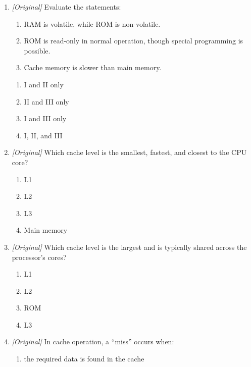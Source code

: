 \documentclass[11pt]{article}
\begin{document}
\begin{enumerate}[label=\textbf{Q\arabic*.}, leftmargin=*]
\begin{enumerate}[label=\Alph*.]
    \item a volatile form of DRAM
    \item an EEPROM-derived non-volatile memory erased in blocks
    \item the mask-programmed type of ROM
    \item a type of CPU register
  \end{enumerate}
\item \textit{[Original]} Evaluate the statements:
  \begin{enumerate}[label=\Roman*.]
    \item RAM is volatile, while ROM is non-volatile.
    \item ROM is read-only in normal operation, though special programming
      is possible.
    \item Cache memory is slower than main memory.
  \end{enumerate}
  \begin{enumerate}[label=\Alph*.]
    \item I and II only
    \item II and III only
    \item I and III only
    \item I, II, and III
  \end{enumerate}
\item \textit{[Original]} Which cache level is the smallest, fastest, and
  closest to the CPU core?
  \begin{enumerate}[label=\Alph*.]
    \item L1
    \item L2
    \item L3
    \item Main memory
  \end{enumerate}
\item \textit{[Original]} Which cache level is the largest and is typically
  shared across the processor's cores?
  \begin{enumerate}[label=\Alph*.]
    \item L1
    \item L2
    \item ROM
    \item L3
  \end{enumerate}
\item \textit{[Original]} In cache operation, a ``miss'' occurs when:
  \begin{enumerate}[label=\Alph*.]
    \item the required data is found in the cache

\end{enumerate}
\end{enumerate}
\end{document}
